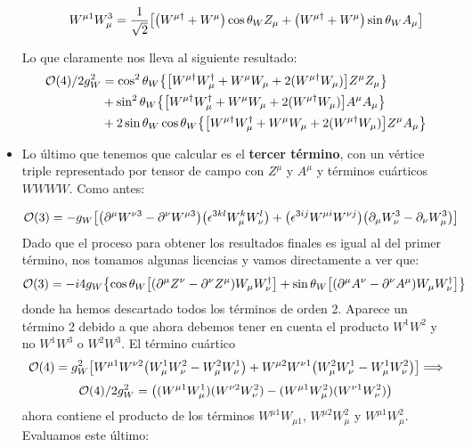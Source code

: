 \begin{itemize}
\begin{itemize}
\begin{equation}
			W^{\mu  1} W_{\mu}^3 =  \frac{1}{\sqrt{2}} \bqty{\pqty{W^{\mu \dagger}+W^{\mu}} \cos \theta_W Z_\mu + \pqty{W^{\mu \dagger} + W^{\mu}} \sin \theta_W A_\mu  }
		\end{equation}
	\end{itemize}
	Lo que claramente nos lleva al siguiente resultado: 
	\begin{align}
		\Ocal(4)  /2g_W^2 & = \cos^2 \theta_W \Bqty{\bqty{W^{\mu \dagger} W_{\mu}^{\dagger} + W^{\mu } W_{\mu}  + 2(W^{\mu \dagger} W_{\mu})  }Z^\mu Z_\mu} \nonumber \\
		& + \sin^2 \theta_W \Bqty{\bqty{W^{\mu \dagger} W_{\mu}^{\dagger} + W^{\mu } W_{\mu} +  2(W^{\mu \dagger} W_{\mu})  }A^\mu A_\mu} \nonumber \\ 
		& + 2 \sin \theta_W \cos \theta_W \Bqty{\bqty{W^{\mu \dagger} W_{\mu}^{\dagger} + W^{\mu } W_{\mu} +  2(W^{\mu \dagger} W_{\mu})  }Z^\mu A_\mu} 
	\end{align}
	\item Lo último que tenemos que calcular es el \textbf{tercer término}, con un vértice triple representado por tensor de campo con $Z^\mu$ y $A^\mu$ y términos cuárticos $WWWW$. Como antes: 
	
	\begin{equation} \small
		\Ocal(3) = - g_W \bqty{\pqty{\partial^\mu W^{\nu 3} - \partial^\nu W^{\mu 3}}\pqty{\epsilon^{3kl} W^k_\mu W^l_\nu} + \pqty{ \epsilon^{3ij} W^{\mu i} W^{\nu j}} \pqty{\partial_\mu W^3_\nu - \partial_\nu W^3_\mu}}
	\end{equation}
	Dado que el proceso para obtener los resultados finales es igual al del primer término, nos tomamos algunas licencias y vamos directamente a ver que: 
	\begin{equation} \small
		\Ocal(3) = - i 4 g_W \Bqty{\cos\theta_W\bqty{\pqty{\partial^\mu Z^{\nu} - \partial^\nu Z^{\mu }} W_\mu W_\nu^\dagger} + \sin \theta_W\bqty{\pqty{\partial^\mu A^{\nu} - \partial^\nu A^{\mu}}W_\mu W_\nu^\dagger}}
	\end{equation}
	donde ha hemos descartado todos los términos de orden 2. Aparece un término 2 debido a que ahora debemos tener en cuenta el producto $W^1 W^2$ y no $W^1 W^3$ o $W^2  W^3$. El término cuártico 
	\begin{equation}
		\Ocal(4) = g_W^2 \bqty{W^{\mu  1} W^{\nu 2} \pqty{W_{\mu}^1 W_{\nu}^2-W_{\mu}^2 W_{\nu}^1}+W^{\mu 2} W^{\nu 1} \pqty{W_{\mu}^2 W_{\nu}^1-W_{\mu}^1 W_{\nu}^2} } \Longrightarrow
	\end{equation}
	\begin{align}
		\Ocal(4)  /2g_W^2 = \pqty{ (W^{\mu 1}W_{\mu}^1)(W^{\nu 2} W_\nu^2)-(W^{\mu 1}W^{2}_{\mu})(W^{\nu 1} W_\nu^2)}
	\end{align}
	ahora contiene el producto de los términos $W^{\mu 1}W_{\mu 1}$, $W^{\mu 2}W_{\mu}^2$ y  $W^{\mu 1}W_{\mu}^2$. Evaluamos este último: 


\end{itemize}

